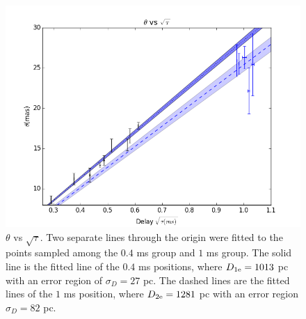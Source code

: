 \documentclass[useAMS,usenatbib]{mn2e}
\begin{document}
\begin{figure}
\centering
\includegraphics[width=1.0\linewidth, angle=0]{Theta_tau.png}
\caption{${\theta}$ vs ${\sqrt{\tau}}$. Two separate lines through the
  origin were fitted to the points sampled among the $0.4$ ms group
  and $1$ ms group. The solid line is the fitted line of the $0.4$ ms
  positions, where $D_{1\rm e}=1013$ pc with an error region of
  $\sigma_D=27$ pc. The dashed lines are the fitted lines of the $1$ ms
  position, where $D_{2\rm e}=1281$ pc with an error region
  $\sigma_D=82$ pc.
}
\label{thetatau}
\end{figure}
\end{document}
